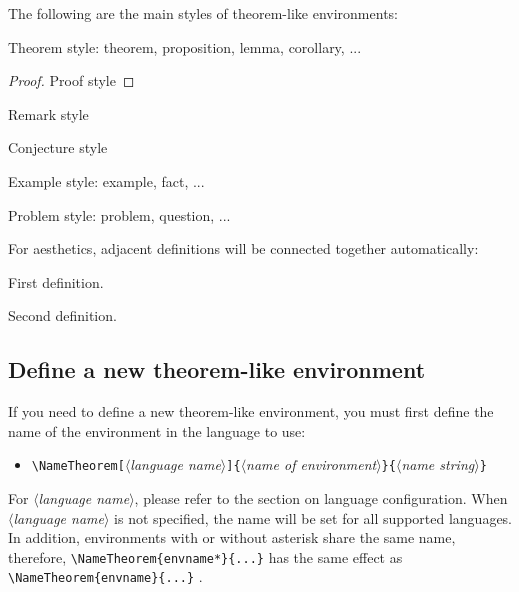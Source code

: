 \documentclass[allowbf,puretext]{colorart}
\theoremstyle{basic}
\theoremstyle{emphasis}
\theoremstyle{simple}
\providecommand{\meta}[1]{$\langle${\normalfont\itshape#1}$\rangle$}
\begin{document}
\bigskip
The following are the main styles of theorem-like environments:
\begin{theorem}
    Theorem style: theorem, proposition, lemma, corollary, ...
\end{theorem}

\begin{proof}
    Proof style
\end{proof}

\begin{remark}
    Remark style
\end{remark}

\begin{conjecture}
    Conjecture style
\end{conjecture}

\begin{example*}
    Example style: example, fact, ...
\end{example*}

\begin{problem}
    Problem style: problem, question, ...
\end{problem}

\medskip
For aesthetics, adjacent definitions will be connected together automatically:
\begin{definition}
    First definition.
\end{definition}

\begin{definition}
    Second definition.
\end{definition}


\subsection{Define a new theorem-like environment}

If you need to define a new theorem-like environment, you must first define the name of the environment in the language to use:
\begin{itemize}
    \item \lstinline|\NameTheorem[|\meta{language name}\lstinline|]{|\meta{name of environment}\lstinline|}{|\meta{name string}\lstinline|}|
\end{itemize}
For \meta{language name}, please refer to the section on language configuration. When \meta{language name} is not specified, the name will be set for all supported languages. In addition, environments with or without asterisk share the same name, therefore, \lstinline|\NameTheorem{envname*}{...}| has the same effect as \lstinline|\NameTheorem{envname}{...}| .
\end{document}
